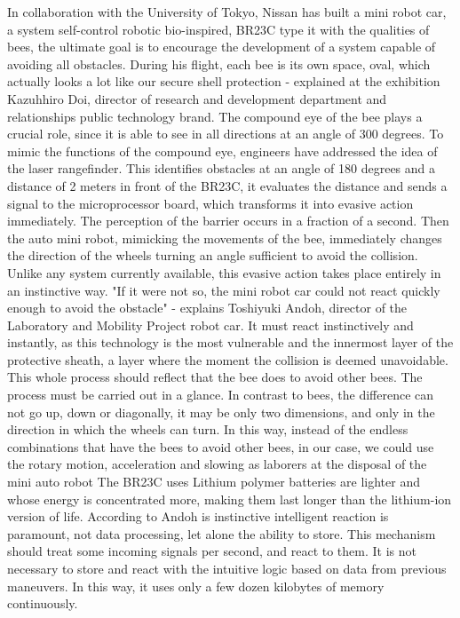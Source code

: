 In collaboration with the University of Tokyo, Nissan has built a mini robot car, a system self-control robotic bio-inspired, BR23C type it with the qualities of bees, the ultimate goal is to encourage the development of a system capable of avoiding all obstacles.
During his flight, each bee is its own space, oval, which actually looks a lot like our secure shell protection - explained at the exhibition Kazuhhiro Doi, director of research and development department and relationships public technology brand.
The compound eye of the bee plays a crucial role, since it is able to see in all directions at an angle of 300 degrees.
To mimic the functions of the compound eye, engineers have addressed the idea of ​​the laser rangefinder.
This identifies obstacles at an angle of 180 degrees and a distance of 2 meters in front of the BR23C, it evaluates the distance and sends a signal to the microprocessor board, which transforms it into evasive action immediately.
The perception of the barrier occurs in a fraction of a second. Then the auto mini robot, mimicking the movements of the bee, immediately changes the direction of the wheels turning an angle sufficient to avoid the collision.
Unlike any system currently available, this evasive action takes place entirely in an instinctive way.
"If it were not so, the mini robot car could not react quickly enough to avoid the obstacle" - explains Toshiyuki Andoh, director of the Laboratory and Mobility Project robot car.
It must react instinctively and instantly, as this technology is the most vulnerable and the innermost layer of the protective sheath, a layer where the moment the collision is deemed unavoidable.
This whole process should reflect that the bee does to avoid other bees.
The process must be carried out in a glance.
In contrast to bees, the difference can not go up, down or diagonally, it may be only two dimensions, and only in the direction in which the wheels can turn.
In this way, instead of the endless combinations that have the bees to avoid other bees, in our case, we could use the rotary motion, acceleration and slowing as laborers at the disposal of the mini auto robot
The BR23C uses Lithium polymer batteries are lighter and whose energy is concentrated more, making them last longer than the lithium-ion version of life.
According to Andoh is instinctive intelligent reaction is paramount, not data processing, let alone the ability to store.
This mechanism should treat some incoming signals per second, and react to them.
It is not necessary to store and react with the intuitive logic based on data from previous maneuvers. In this way, it uses only a few dozen kilobytes of memory continuously.
